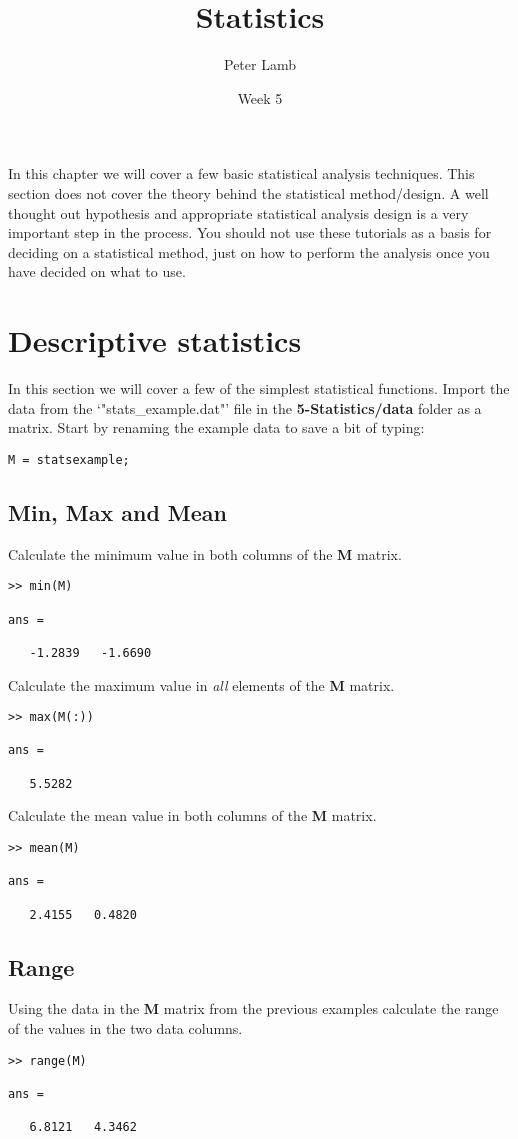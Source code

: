 \documentclass[12pt,a4paper]{article}
\title{Statistics}
\author{Peter Lamb}
\date{Week 5}
\begin{document}
\maketitle

In this chapter we will cover a few basic statistical analysis techniques.  
This section does not cover the theory behind the statistical method/design.  
A well thought out hypothesis and appropriate statistical analysis design is a very important step in the process.  
You should not use these tutorials as a basis for deciding on a statistical method, just on how to perform the analysis once you have decided on what to use.

\section{Descriptive statistics}
In this section we will cover a few of the simplest statistical functions.  Import the data from the `"stats_example.dat"' file in the \textbf{5-Statistics/data} folder as a matrix. Start by renaming the example data to save a bit of typing:
\begin{lstlisting}[style=Matlab-editor]
M = statsexample;
\end{lstlisting}

\subsection{Min, Max and Mean}
Calculate the minimum value in both columns of the \textbf{M} matrix.
\begin{lstlisting}[style=Matlab-editor]
>> min(M)

ans =

   -1.2839   -1.6690
\end{lstlisting}
Calculate the maximum value in \emph{all} elements of the \textbf{M} matrix.
\begin{lstlisting}[style=Matlab-editor]
>> max(M(:))

ans =

   5.5282
\end{lstlisting}
Calculate the mean value in both columns of the \textbf{M} matrix.
\begin{lstlisting}[style=Matlab-editor]
>> mean(M)

ans =

   2.4155   0.4820
\end{lstlisting}

\subsection{Range}
Using the data in the \textbf{M} matrix from the previous examples calculate the range of the values in the two data columns.
\begin{lstlisting}[style=Matlab-editor]
>> range(M)
	
ans =

   6.8121   4.3462
\end{lstlisting}
\end{document}
